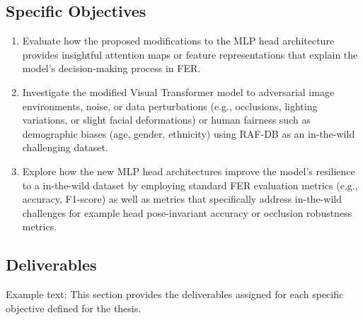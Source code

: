 \subsection{Specific Objectives}
\label{section:specific-objectives}
	
	
	

\begin{enumerate}

\item Evaluate how the proposed modifications to the MLP head architecture provides insightful attention maps or feature representations that explain the model's decision-making process in FER.
	
\item Investigate the modified Visual Transformer model to adversarial image environments, noise, or data perturbations (e.g., occlusions, lighting variations, or slight facial deformations) or human fairness such as demographic biases (age, gender, ethnicity) using RAF-DB as an in-the-wild challenging dataset. 
	
\item Explore how the new MLP head architectures improve the model’s resilience to a in-the-wild dataset by employing standard FER evaluation metrics (e.g., accuracy, F1-score) as well as metrics that specifically address in-the-wild challenges for example head pose-invariant accuracy  or occlusion robustness metrics.
	
\end{enumerate}

\subsection{Deliverables}
Example text:
This section provides the deliverables assigned for each specific objective defined for the thesis.


